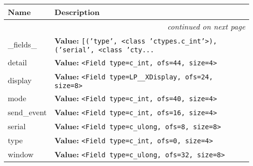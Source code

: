     \vspace{-1cm}
\hspace{\varindent}\begin{longtable}{|p{\varnamewidth}|p{\vardescrwidth}|l}
\cline{1-2}
\cline{1-2} \centering \textbf{Name} & \centering \textbf{Description}& \\
\cline{1-2}
\endhead\cline{1-2}\multicolumn{3}{r}{\small\textit{continued on next page}}\\\endfoot\cline{1-2}
\endlastfoot\raggedright \_\-f\-i\-e\-l\-d\-s\-\_\- & \raggedright \textbf{Value:} 
{\tt \texttt{[}\texttt{(}\texttt{'}\texttt{type}\texttt{'}\texttt{, }{\textless}class 'ctypes.c\_int'{\textgreater}\texttt{)}\texttt{, }\texttt{(}\texttt{'}\texttt{serial}\texttt{'}\texttt{, }{\textless}class 'cty\texttt{...}}&\\
\cline{1-2}
\raggedright d\-e\-t\-a\-i\-l\- & \raggedright \textbf{Value:} 
{\tt {\textless}Field type=c\_int, ofs=44, size=4{\textgreater}}&\\
\cline{1-2}
\raggedright d\-i\-s\-p\-l\-a\-y\- & \raggedright \textbf{Value:} 
{\tt {\textless}Field type=LP\_\_XDisplay, ofs=24, size=8{\textgreater}}&\\
\cline{1-2}
\raggedright m\-o\-d\-e\- & \raggedright \textbf{Value:} 
{\tt {\textless}Field type=c\_int, ofs=40, size=4{\textgreater}}&\\
\cline{1-2}
\raggedright s\-e\-n\-d\-\_\-e\-v\-e\-n\-t\- & \raggedright \textbf{Value:} 
{\tt {\textless}Field type=c\_int, ofs=16, size=4{\textgreater}}&\\
\cline{1-2}
\raggedright s\-e\-r\-i\-a\-l\- & \raggedright \textbf{Value:} 
{\tt {\textless}Field type=c\_ulong, ofs=8, size=8{\textgreater}}&\\
\cline{1-2}
\raggedright t\-y\-p\-e\- & \raggedright \textbf{Value:} 
{\tt {\textless}Field type=c\_int, ofs=0, size=4{\textgreater}}&\\
\cline{1-2}
\raggedright w\-i\-n\-d\-o\-w\- & \raggedright \textbf{Value:} 
{\tt {\textless}Field type=c\_ulong, ofs=32, size=8{\textgreater}}&\\
\cline{1-2}
\end{longtable}



